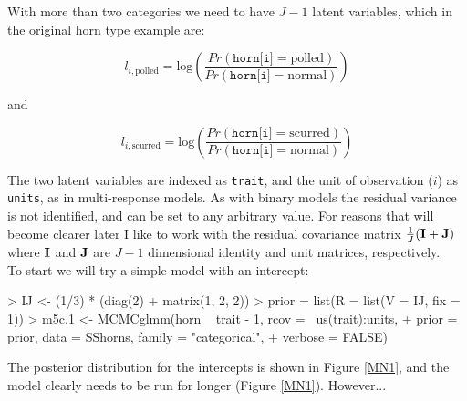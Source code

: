 \documentclass{article}
\begin{document}
With more than two categories we need to have $J-1$ latent variables, which in the original horn type example are:

\begin{equation}
l_{i,\textrm{polled}} = \textrm{log}\left(\frac{Pr(\texttt{horn[i]}=\textrm{polled})}{Pr(\texttt{horn[i]}=\textrm{normal})}\right)
\end{equation}

and 

\begin{equation}
l_{i,\textrm{scurred}} = \textrm{log}\left(\frac{Pr(\texttt{horn[i]}=\textrm{scurred})}{Pr(\texttt{horn[i]}=\textrm{normal})}\right)
\end{equation}


The two latent variables are indexed as \texttt{trait}, and the unit of observation ($i$) as \texttt{units}, as in multi-response models. As with binary models the residual variance is not identified, and can be set to any arbitrary value. For reasons that will become clearer later I like to work with the residual covariance matrix $\frac{1}{J}({\bf I}+{\bf J})$ where  ${\bf I}$ and ${\bf J}$ are $J-1$ dimensional identity and unit matrices, respectively.\\

To start we will try a simple model with an intercept:\\

\begin{Schunk}
\begin{Sinput}
> IJ <- (1/3) * (diag(2) + matrix(1, 2, 2))
> prior = list(R = list(V = IJ, fix = 1))
> m5c.1 <- MCMCglmm(horn ~ trait - 1, rcov = ~us(trait):units, 
+     prior = prior, data = SShorns, family = "categorical", 
+     verbose = FALSE)
\end{Sinput}
\end{Schunk}

The posterior distribution for the intercepts is shown in Figure \ref{MN1}, and the model clearly needs to be run for longer (Figure \ref{MN1}). However...\\
\end{document}
